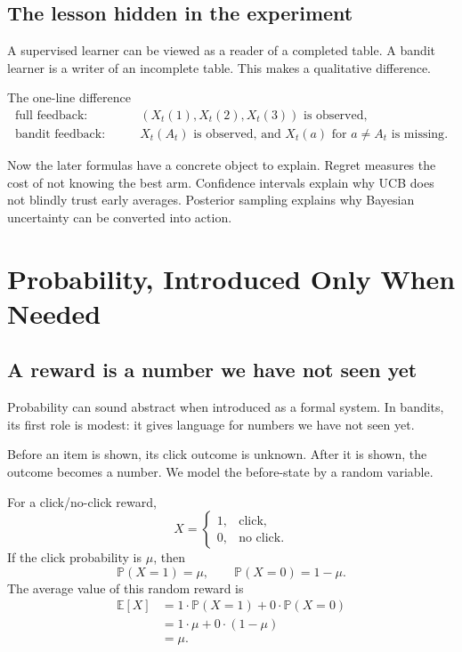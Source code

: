\documentclass[en,nofont,11pt]{elegantbook}
\newcommand{\E}{\mathbb{E}}
\newcommand{\Pp}{\mathbb{P}}
\begin{document}
\section{The lesson hidden in the experiment}

A supervised learner can be viewed as a reader of a completed table. A bandit learner is a writer of an incomplete table. This makes a qualitative difference.

\begin{derivationbox}{The one-line difference}
\[
\begin{aligned}
\text{full feedback:}&\qquad (X_t(1),X_t(2),X_t(3))\text{ is observed},\\
\text{bandit feedback:}&\qquad X_t(A_t)\text{ is observed, and }X_t(a)\text{ for }a\neq A_t\text{ is missing}.
\end{aligned}
\]
\end{derivationbox}

Now the later formulas have a concrete object to explain. Regret measures the cost of not knowing the best arm. Confidence intervals explain why UCB does not blindly trust early averages. Posterior sampling explains why Bayesian uncertainty can be converted into action.

\chapter{Probability, Introduced Only When Needed}

\section{A reward is a number we have not seen yet}

Probability can sound abstract when introduced as a formal system. In bandits, its first role is modest: it gives language for numbers we have not seen yet.

Before an item is shown, its click outcome is unknown. After it is shown, the outcome becomes a number. We model the before-state by a random variable.

For a click/no-click reward,
\[
X=\begin{cases}
1, & \text{click},\\
0, & \text{no click}.
\end{cases}
\]
If the click probability is $\mu$, then
\[
\Pp(X=1)=\mu,
\qquad
\Pp(X=0)=1-\mu.
\]
The average value of this random reward is
\[
\begin{aligned}
\E[X]
&=1\cdot \Pp(X=1)+0\cdot \Pp(X=0)\\
&=1\cdot \mu+0\cdot(1-\mu)\\
&=\mu.
\end{aligned}
\]
\end{document}
